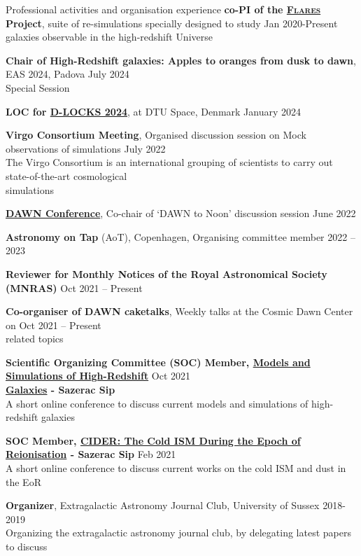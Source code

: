 \documentclass[a4paper,10pt]{resume} %
\begin{document}
\begin{rSection}{Professional activities and organisation experience}
	{\textbf{co-PI of the \href{https://flaresimulations.github.io/}{\textsc{Flares}} Project}, suite of re-simulations specially designed to study } \hfill {Jan 2020-Present}\\
	galaxies observable in the high-redshift Universe
	
	{\textbf{Chair of High-Redshift galaxies: Apples to oranges from dusk to dawn}, EAS 2024, Padova} \hfill July 2024\\
	Special Session
	
	{\textbf{LOC for \href{https://d-locks.github.io/}{D-LOCKS 2024}}, at DTU Space, Denmark} \hfill January 2024
	
	{\textbf{Virgo Consortium Meeting}, Organised discussion session on Mock observations of simulations} \hfill {July 2022}
	\\
	The Virgo Consortium is an international grouping of scientists to carry out state-of-the-art cosmological \\simulations 
	
	{\textbf{\href{https://cosmicdawn.dk/event/copenhagen-dawn-conference-2022/}{DAWN Conference}}, Co-chair of `DAWN to Noon' discussion session} \hfill {June 2022}
	
	{\textbf{Astronomy on Tap} (AoT), Copenhagen, Organising committee member} \hfill {2022 -- 2023}
	
	{\textbf{Reviewer for Monthly Notices of the Royal Astronomical Society (MNRAS)}} \hfill {Oct 2021 -- Present}
	
	{\textbf{Co-organiser of DAWN caketalks}, Weekly talks at the Cosmic Dawn Center on} \hfill {Oct 2021 -- Present}
	\\
	related topics
	
	{\textbf{Scientific Organizing Committee (SOC) Member, \href{http://sazerac-conference.org/SIPS2122/1.html}{Models and Simulations of High-Redshift}}} \hfill {Oct 2021}\\
	\textbf{\href{http://sazerac-conference.org/SIPS2122/1.html}{Galaxies} - Sazerac Sip}
	\\
	{A short online conference to discuss current models and simulations of high-redshift galaxies}
	
	{\textbf{SOC Member, \href{http://sazerac-conference.org/SIPS2021/4.html}{CIDER: The Cold ISM During the Epoch of Reionisation} - Sazerac Sip}} \hfill {Feb 2021}
	\\
	{A short online conference to discuss current works on the cold ISM and dust in the EoR}
	
	{\textbf{Organizer}, Extragalactic Astronomy Journal Club, University of Sussex} \hfill {2018-2019}\\
	{Organizing the extragalactic astronomy journal club, by delegating latest papers to discuss}
\end{rSection}
\end{document}
